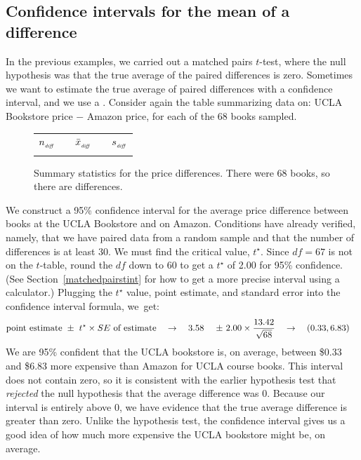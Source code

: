 \D{~}


\subsection{Confidence intervals for the mean of a difference}
\label{ciMeanOfDifferences}

In the previous examples, we carried out a matched pairs $t$-test, where the null hypothesis was that the true average of the paired differences is zero. Sometimes we want to estimate the true average of paired differences with a confidence interval, and we use a . Consider again the table summarizing data on: UCLA Bookstore price $-$ Amazon price, for each of the 68 books sampled.

\begin{figure}[hh]
\centering
\begin{tabular}{ccccc}
\hline
$n_{_{\text{\emph{diff}}}}$	&\hspace{3mm}& $\bar{x}_{_{\text{\emph{diff}}}}$	&\hspace{3mm}& $s_{_{\text{\emph{diff}}}}$ \vspace{1mm}\\
\uclabookN{}  && \uclabookM{}  && \uclabookSD{} \\
\hline
\end{tabular}
\caption{Summary statistics for the price differences.
    There were 68 books, so there are \uclabookN{}
    differences.}
\label{textbooksSummaryStats1}
\end{figure}

We construct a 95\% confidence interval for the average price difference between books at the UCLA Bookstore and on Amazon. Conditions have already verified, namely, that we have paired data from a random sample and that the number of differences is at least 30.  We must find the critical value, $t^{\star}$. Since $df = 67$ is not on the $t$-table, round the $df$ down to 60 to get a $t^{\star}$ of 2.00 for 95\% confidence. (See Section~\ref{matchedpairstint} for how to get a more precise interval using a calculator.)  Plugging the $t^{\star}$ value, point estimate, and standard error into the confidence interval formula, we~get:
\begin{align*}
\text{point estimate} \ &\pm\ t^{\star}\times SE\ \text{of estimate}
  \quad\to\quad
      \uclabookM{} \ &\pm\ 
          2.00 \times
          \frac{\uclabookSD{}}{\sqrt{\uclabookN{}}}
  \quad\to\quad
      (0.33&,  6.83)
\end{align*}
We are 95\% confident that the UCLA bookstore is, on average, between \$0.33 and \$6.83 more expensive than Amazon for UCLA course books. This interval does not contain zero, so it is consistent with the earlier hypothesis test that \emph{rejected} the null hypothesis that the average difference was 0. Because our interval is entirely above 0, we have evidence that the true average difference is greater than zero. Unlike the hypothesis test, the confidence interval gives us a good idea of how much more expensive the UCLA bookstore might be, on average.

